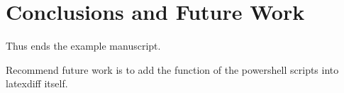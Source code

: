 \documentclass[preprint,3p,11pt,sort]{elsarticle}
\begin{document}
\section{Conclusions and Future Work} \label{sec:conclusions}
Thus ends the example manuscript.

Recommend future work is to add the function of the powershell scripts into latexdiff itself.


\FloatBarrier



\end{document}
